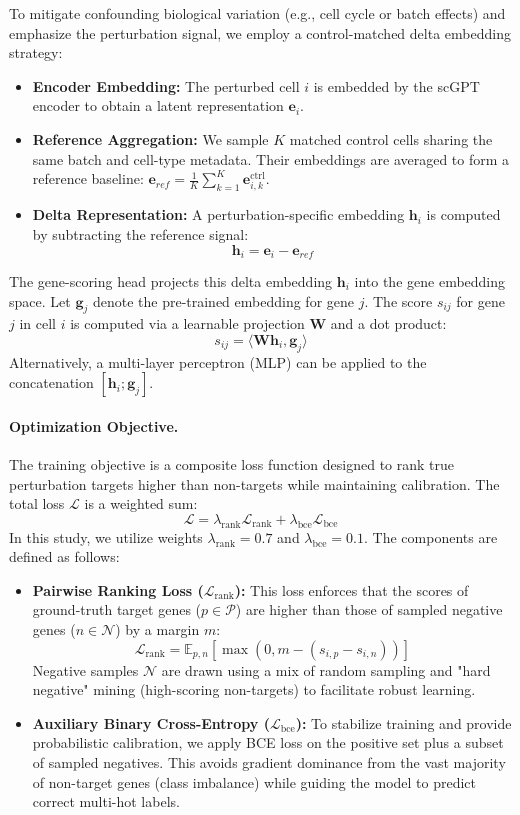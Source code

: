 \documentclass[conference]{IEEEtran}
\begin{document}
To mitigate confounding biological variation (e.g., cell cycle or batch effects) and emphasize the perturbation signal, we employ a control-matched delta embedding strategy:
\begin{itemize}
    \item \textbf{Encoder Embedding:} The perturbed cell $i$ is embedded by the scGPT encoder to obtain a latent representation $\mathbf{e}_i$.
    \item \textbf{Reference Aggregation:} We sample $K$ matched control cells sharing the same batch and cell-type metadata. Their embeddings are averaged to form a reference baseline: $\mathbf{e}_{ref} = \frac{1}{K}\sum_{k=1}^K \mathbf{e}_{i,k}^{\text{ctrl}}$.
    \item \textbf{Delta Representation:} A perturbation-specific embedding $\mathbf{h}_i$ is computed by subtracting the reference signal:
    \[
    \mathbf{h}_i = \mathbf{e}_i - \mathbf{e}_{ref}
    \]
\end{itemize}
The gene-scoring head projects this delta embedding $\mathbf{h}_i$ into the gene embedding space. Let $\mathbf{g}_j$ denote the pre-trained embedding for gene $j$. The score $s_{ij}$ for gene $j$ in cell $i$ is computed via a learnable projection $\mathbf{W}$ and a dot product:
\[
s_{ij} = \langle \mathbf{W} \mathbf{h}_i, \mathbf{g}_j \rangle
\]
Alternatively, a multi-layer perceptron (MLP) can be applied to the concatenation $[\mathbf{h}_i; \mathbf{g}_j]$.

\paragraph{Optimization Objective.}
The training objective is a composite loss function designed to rank true perturbation targets higher than non-targets while maintaining calibration. The total loss $\mathcal{L}$ is a weighted sum:
\[
\mathcal{L} = \lambda_{\text{rank}}\mathcal{L}_{\text{rank}} + \lambda_{\text{bce}}\mathcal{L}_{\text{bce}}
\]
In this study, we utilize weights $\lambda_{\text{rank}}=0.7$ and $\lambda_{\text{bce}}=0.1$. The components are defined as follows:
\begin{itemize}
    \item \textbf{Pairwise Ranking Loss ($\mathcal{L}_{\text{rank}}$):} This loss enforces that the scores of ground-truth target genes ($p \in \mathcal{P}$) are higher than those of sampled negative genes ($n \in \mathcal{N}$) by a margin $m$:
    \[
    \mathcal{L}_{\text{rank}} = \mathbb{E}_{p, n} \left[ \max(0, m - (s_{i,p} - s_{i,n})) \right]
    \]
    Negative samples $\mathcal{N}$ are drawn using a mix of random sampling and "hard negative" mining (high-scoring non-targets) to facilitate robust learning.
    \item \textbf{Auxiliary Binary Cross-Entropy ($\mathcal{L}_{\text{bce}}$):} To stabilize training and provide probabilistic calibration, we apply BCE loss on the positive set plus a subset of sampled negatives. This avoids gradient dominance from the vast majority of non-target genes (class imbalance) while guiding the model to predict correct multi-hot labels.
\end{itemize}
\end{document}
